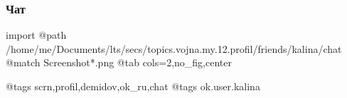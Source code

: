  
 
 
 
 

\subsubsection{Чат}

\ifcmt
  import
  @path /home/me/Documents/lts/secs/topics.vojna.my.12.profil/friends/kalina/chat
  @match Screenshot*.png
  @tab cols=2,no_fig,center

  @tags scrn,profil,demidov,ok_ru,chat
  @tags ok.user.kalina

\fi

